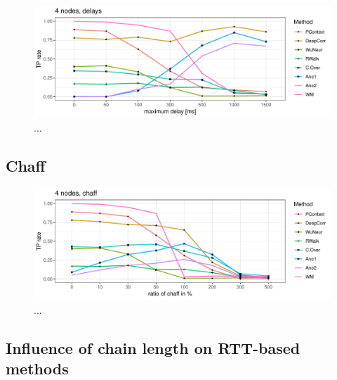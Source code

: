 \documentclass[runningheads]{llncs}\usepackage[]{graphicx}\usepackage[]{color}
\makeatletter
\def\maxwidth{ %
  \ifdim\Gin@nat@width>\linewidth
    \linewidth
  \else
    \Gin@nat@width
  \fi
}
\newenvironment{knitrout}{}{} %
\makeatother
\begin{document}
\begin{knitrout}
\color{fgcolor}\begin{figure}
\includegraphics[width=\maxwidth]{figure/Delaydetection-1} \caption[..]{...}\label{fig:Delaydetection}
\end{figure}


\end{knitrout}


\subsection{Chaff}

\begin{knitrout}
\color{fgcolor}\begin{figure}
\includegraphics[width=\maxwidth]{figure/Chaffdetection-1} \caption[..]{...}\label{fig:Chaffdetection}
\end{figure}


\end{knitrout}








\subsection{Influence of chain length on RTT-based methods}
\end{document}
